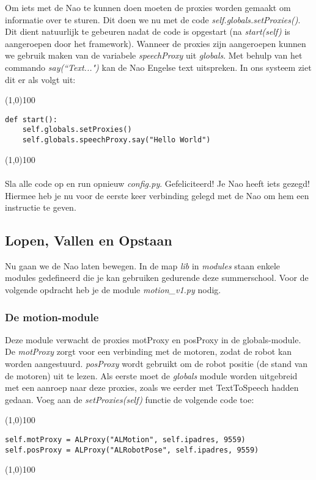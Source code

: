 \documentclass[a4paper]{article}
\begin{document}
Om iets met de Nao te kunnen doen moeten de proxies worden gemaakt om informatie over te sturen. Dit doen we nu met de code \textit{self.globals.setProxies()}. Dit dient natuurlijk te gebeuren nadat de code is opgestart (na \textit{start(self)} is aangeroepen door het framework).
Wanneer de proxies zijn aangeroepen kunnen we gebruik maken van de variabele \textit{speechProxy} uit \textit{globals}.
Met behulp van het commando \textit{say(``Text...")} kan de Nao Engelse text uitspreken. In ons systeem ziet dit er als volgt uit:

\noindent \line(1,0){100}
\begin{verbatim}
def start():
    self.globals.setProxies()
    self.globals.speechProxy.say("Hello World")
\end{verbatim}
\noindent \line(1,0){100}
\\\\
Sla alle code op en run opnieuw \textit{config.py}. Gefeliciteerd! Je Nao heeft iets gezegd! Hiermee heb je nu voor de eerste keer verbinding gelegd met de Nao om hem een instructie te geven.

\subsection{Lopen, Vallen en Opstaan}
Nu gaan we de Nao laten bewegen.
In de map \textit{lib} in \textit{modules} staan enkele modules gedefineerd die je kan gebruiken gedurende deze summerschool.
Voor de volgende opdracht heb je de module \textit{motion\_v1.py} nodig.

\subsubsection{De motion-module}
Deze module verwacht de proxies motProxy en posProxy in de globals-module. De \textit{motProxy} zorgt voor een verbinding met de motoren, zodat de robot kan worden aangestuurd. \textit{posProxy} wordt gebruikt om de robot positie (de stand van de motoren) uit te lezen. Als eerste moet de \textit{globals} module worden uitgebreid met een aanroep naar deze proxies, zoals we eerder met TextToSpeech hadden gedaan.
Voeg aan de \textit{setProxies(self)} functie de volgende code toe:

\noindent \line(1,0){100}
\begin{verbatim}
self.motProxy = ALProxy("ALMotion", self.ipadres, 9559)
self.posProxy = ALProxy("ALRobotPose", self.ipadres, 9559)
\end{verbatim}
\noindent \line(1,0){100}
\\\\
\end{document}
